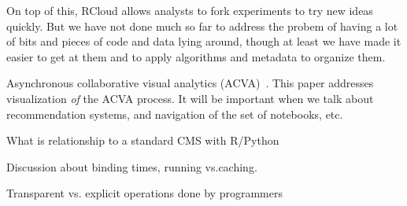 On top of this, RCloud allows analysts to fork experiments to try
new ideas quickly. But we have not done much so far to address the
probem of having a lot of bits and pieces of code and data lying
around, though at least we have made it easier to get at them and
to apply algorithms and metadata to organize them.

Asynchronous collaborative visual analytics
(ACVA)~\cite{Chen:2011:SEC}. This paper addresses visualization
\emph{of} the ACVA process. It will be important when we talk about
recommendation systems, and navigation of the set of notebooks, etc.

What is relationship to a standard CMS with R/Python

Discussion about binding times, running vs.caching.

Transparent vs. explicit operations done by programmers
